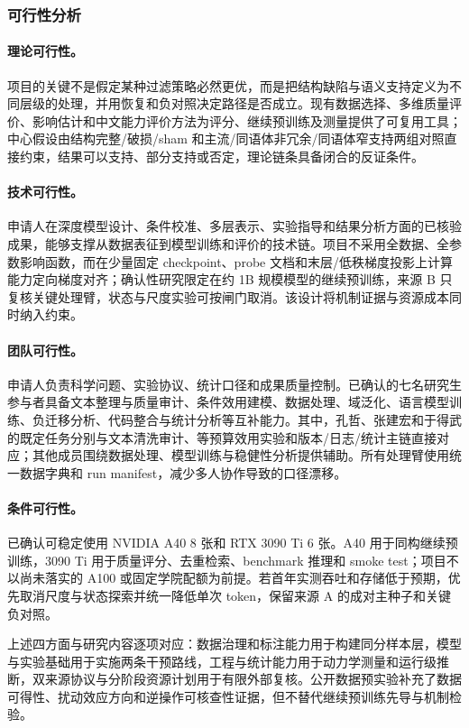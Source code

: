 \subsubsection{可行性分析}

\paragraph{理论可行性。}项目的关键不是假定某种过滤策略必然更优，而是把结构缺陷与语义支持定义为不同层级的处理，并用恢复和负对照决定路径是否成立。现有数据选择、多维质量评价、影响估计和中文能力评价方法为评分、继续预训练及测量提供了可复用工具；中心假设由结构完整/破损/sham 和主流/同语体非冗余/同语体窄支持两组对照直接约束，结果可以支持、部分支持或否定，理论链条具备闭合的反证条件。

\paragraph{技术可行性。}申请人在深度模型设计、条件校准、多层表示、实验指导和结果分析方面的已核验成果，能够支撑从数据表征到模型训练和评价的技术链。项目不采用全数据、全参数影响函数，而在少量固定 checkpoint、probe 文档和末层/低秩梯度投影上计算能力定向梯度对齐；确认性研究限定在约 1B 规模模型的继续预训练，来源 B 只复核关键处理臂，状态与尺度实验可按闸门取消。该设计将机制证据与资源成本同时纳入约束。

\paragraph{团队可行性。}申请人负责科学问题、实验协议、统计口径和成果质量控制。已确认的七名研究生参与者具备文本整理与质量审计、条件效用建模、数据处理、域泛化、语言模型训练、负迁移分析、代码整合与统计分析等互补能力。其中，孔哲、张建宏和于得武的既定任务分别与文本清洗审计、等预算效用实验和版本/日志/统计主链直接对应；其他成员围绕数据处理、模型训练与稳健性分析提供辅助。所有处理臂使用统一数据字典和 run manifest，减少多人协作导致的口径漂移。

\paragraph{条件可行性。}已确认可稳定使用 NVIDIA A40 8 张和 RTX 3090 Ti 6 张。A40 用于同构继续预训练，3090 Ti 用于质量评分、去重检索、benchmark 推理和 smoke test；项目不以尚未落实的 A100 或固定学院配额为前提。若首年实测吞吐和存储低于预期，优先取消尺度与状态探索并统一降低单次 token，保留来源 A 的成对主种子和关键负对照。

上述四方面与研究内容逐项对应：数据治理和标注能力用于构建同分样本层，模型与实验基础用于实施两条干预路线，工程与统计能力用于动力学测量和运行级推断，双来源协议与分阶段资源计划用于有限外部复核。公开数据预实验补充了数据可得性、扰动效应方向和逆操作可核查性证据，但不替代继续预训练先导与机制检验。

